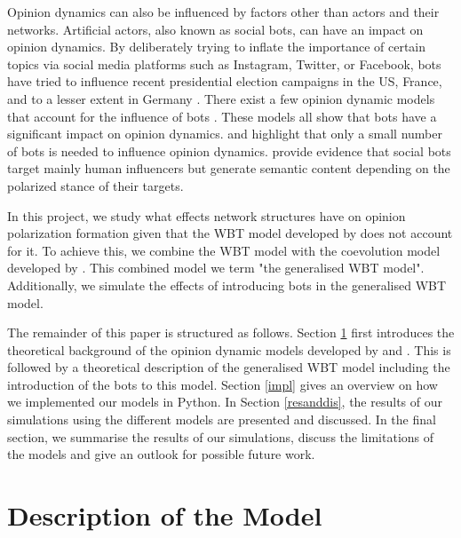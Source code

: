 \documentclass[11pt]{article}
\begin{document}
Opinion dynamics can also be influenced by factors other than actors and their networks. Artificial actors, also known as social bots, can have an impact on opinion dynamics. By deliberately trying to inflate the importance of certain topics via social media platforms such as Instagram, Twitter, or Facebook, bots have tried to influence recent presidential election campaigns in the US, France, and to a lesser extent in Germany \citep{kupferschmidt2017,bohannon2017}. There exist a few opinion dynamic models that account for the influence of bots \citep{ross2019,stella2018bots,el2018}. These models all show that bots have a significant impact on opinion dynamics. \citet{ross2019} and \citet{el2018} highlight that only a small number of bots is needed to influence opinion dynamics. \citet{stella2018bots} provide evidence that social bots target mainly human influencers but generate semantic content depending on the polarized stance of their targets. 

In this project, we study what effects network structures have on opinion polarization formation given that the WBT model developed by \citet{schweighofer2020} does not account for it. To achieve this, we combine the WBT model with the coevolution model developed by \citet{holme2006nonequilibrium}. This combined model we term "the generalised WBT model". Additionally, we simulate the effects of introducing bots in the generalised WBT model.

The remainder of this paper is structured as follows. Section \ref{modeldescr} first introduces the theoretical background of the opinion dynamic models developed by \citet{holme2006nonequilibrium} and \citet{schweighofer2020}. This is followed by a theoretical description of the generalised WBT model including the introduction of the bots to this model. Section \ref{impl} gives an overview on how we implemented our models in Python. In Section \ref{resanddis}, the results of our simulations using the different models are presented and discussed. In the final section, we summarise the results of our simulations, discuss the limitations of the models and give an outlook for possible future work. 


\section{Description of the Model} \label{modeldescr}
\end{document}
